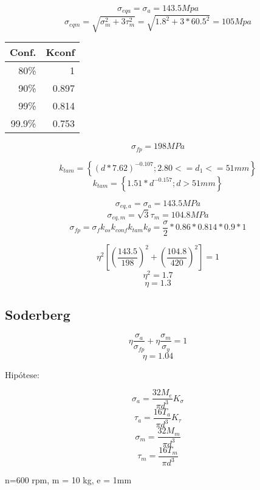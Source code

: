 \[\sigma_{eq a}= \sigma _{a} = 143.5 Mpa\]
\[\sigma_{eq m}= \sqrt{\sigma_{m}^{2}+3\tau_{m}^{2}}=\sqrt{1.8^{2}+3*60.5^{2}}=105 Mpa\]

\begin{table}[htbp]
  \centering
    \begin{tabular}{rr}
    \toprule
    Conf. & Kconf \\
    \midrule
    80\%  & 1 \\
    90\%  & 0.897 \\
    99\%  & 0.814 \\
    99.9\% & 0.753 \\
    \bottomrule
    \end{tabular}%
  \label{tab:1}%
\end{table}%

\[\sigma _{fp}=198 MPa\]



\[k_{tam} = \left\lbrace (d*7.62)^{-0.107};2.80<=d_{1}<=51mm \right\rbrace \]  
\[k_{tam} = \left\lbrace  1.51*d^{-0.157};d>51mm \right\rbrace \]



\[\sigma _{eq,a}=\sigma_{a}=143.5MPa\]
\[\sigma _{eq,m}=\sqrt{3}\tau_{m}=104.8MPa\]
\[\sigma _{fp}= \sigma _{f}k_{os}k_{conf}k_{tam}k_{\theta}=\frac{\sigma}{2}*0.86*0.814*0.9*1\]

\[\eta ^{2}[(\frac{143.5}{198})^{2}+(\frac{104.8}{420})^{2}]=1\]
\[\eta^{2}=1.7\]
\[\eta = 1.3\]

\subsection*{Soderberg}

\[\eta\frac{\sigma _{a}}{\sigma _{fp}}+\eta\frac{\sigma _{m}}{\sigma _{y}}=1\]
\[\eta = 1.04\]

Hipótese:

\[\sigma _{a}=\frac{32M_{e}}{\pi d^{3}}K_{\sigma}\]
\[\tau _{a}= \frac{16T_{a}}{\pi d^{3}}K_{\tau}\]
\[\sigma _{m}=\frac{32M_{m}}{\pi d^{3}}\]
\[\tau _{m}= \frac{16T_{m}}{\pi d^{3}}\]

n=600 rpm, m = 10 kg, e = 1mm

